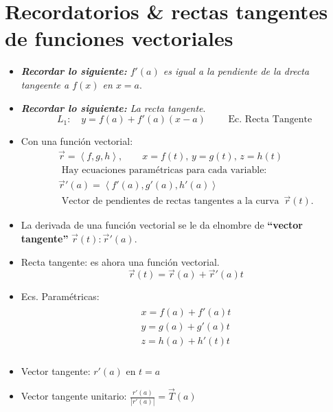 \section{Recordatorios \& rectas tangentes de funciones vectoriales}
\begin{itemize}
    \item \emph{\textbf{Recordar lo siguiente: }$f'(a)$ es igual a la pendiente de la drecta tangeente a $f(x)$ en $x=a$}.
    \item \emph{\textbf{Recordar lo siguiente: }La recta tangente}.
        \[
          L_1: \quad y = f(a)+f'(a)(x-a) \quad \quad \text{  Ec. Recta Tangente  }
        \]
    
    \item Con una función vectorial:
        \begin{align*}
            \vec{r}= \left\langle f,g,h \right\rangle , \quad \quad x = f(t), \, y=g(t), \, z=h(t) \\ 
            \text{  Hay ecuaciones paramétricas para cada variable:  } \\ 
            \vec{r}'(a) = \left\langle f'(a),g'(a),h'(a) \right\rangle \\ 
            \text{  Vector de pendientes de rectas tangentes a la curva  } \, \vec{r}(t).
        \end{align*}
    
    \item La derivada de una función vectorial se le da elnombre de \textbf{``vector tangente''} $\vec{r}(t):\vec{r}'(a)$.
    \item Recta tangente: es ahora una función vectorial.
        \[
          \vec{r}(t) = \vec{r}(a) + \vec{r}'(a)t 
        \]
    
    \item Ecs. Paramétricas:
        \begin{align*}
            \begin{matrix}
                x=f(a)+f'(a)t \\ 
                y=g(a)+g'(a)t \\ 
                z=h(a)+h'(t)t \\ 
            \end{matrix}
        \end{align*}
    
    \item Vector tangente: $r'(a)$ en $t=a$
    \item Vector tangente unitario: $\frac{r'(a)}{\left| r'(a) \right| } = \vec{T}(a)$
\end{itemize}



